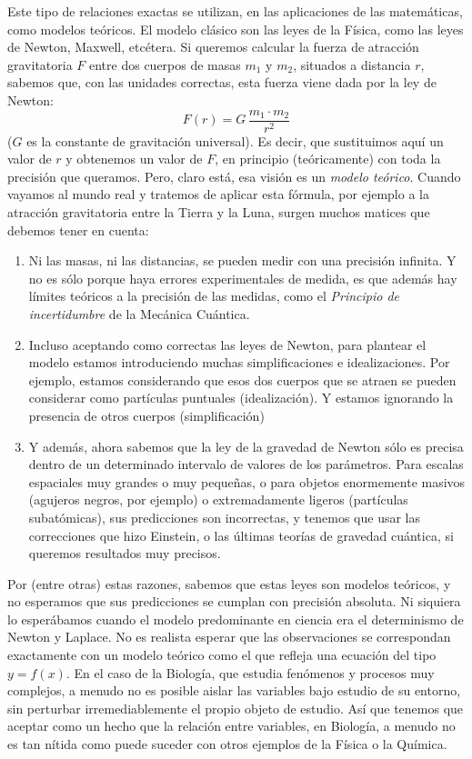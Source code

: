 Este tipo de relaciones exactas se utilizan, en las aplicaciones de las matemáticas, como modelos teóricos. El modelo clásico son las leyes de la Física, como las leyes de Newton, Maxwell, etcétera. Si queremos calcular la fuerza de atracción gravitatoria $F$ entre dos cuerpos de masas $m_1$ y $m_2$, situados a distancia $r$, sabemos que, con las unidades correctas, esta fuerza viene dada por la ley de Newton:
        \[F(r)=G\,\dfrac{m_1\cdot m_2}{r^2}\]
($G$ es la constante de gravitación universal). Es decir, que sustituimos aquí un valor de $r$ y obtenemos un valor de $F$, en principio (teóricamente) con toda la precisión que queramos. Pero, claro está, esa visión es un {\em modelo teórico}. Cuando vayamos al mundo real y tratemos de aplicar esta fórmula, por ejemplo a  la atracción gravitatoria entre la Tierra y la Luna, surgen muchos matices que debemos tener en cuenta:
        \begin{enumerate}
            \item Ni las masas, ni las distancias, se pueden medir con una precisión infinita.
               Y no es sólo porque haya errores experimentales de medida, es que además hay
                límites teóricos a la precisión de las medidas, como el {\em Principio de incertidumbre} de la Mecánica Cuántica.
            \item Incluso aceptando como correctas las leyes de Newton, para plantear el modelo
                estamos introduciendo muchas simplificaciones e idealizaciones. Por ejemplo,  estamos considerando que esos dos cuerpos que se atraen se pueden considerar como partículas puntuales (idealización). Y estamos ignorando la presencia de otros cuerpos (simplificación)
            \item Y además, ahora sabemos que la ley de la gravedad de Newton sólo es precisa
                dentro de un determinado intervalo de valores de los parámetros. Para escalas
                espaciales muy grandes o muy pequeñas, o para objetos enormemente masivos
                (agujeros negros, por ejemplo) o extremadamente ligeros (partículas
                subatómicas), sus predicciones son incorrectas, y tenemos que usar las
                correcciones que hizo Einstein, o las últimas teorías de gravedad cuántica, si
                queremos resultados muy precisos.
        \end{enumerate}

Por (entre otras) estas razones, sabemos que estas leyes son modelos teóricos, y no
esperamos que sus predicciones se cumplan con precisión absoluta. Ni siquiera lo
esperábamos cuando el modelo predominante en ciencia era el determinismo de Newton y
Laplace.
No es realista esperar que las observaciones se correspondan exactamente con un modelo
teórico como el que refleja una ecuación del tipo $y=f(x)$. En el caso de la Biología,
que estudia fenómenos y procesos muy complejos, a menudo no es posible aislar las variables bajo estudio de su entorno, sin perturbar irremediablemente el propio objeto de estudio.
Así que tenemos que aceptar como un hecho que la relación entre variables, en Biología,
a menudo no es tan nítida como puede suceder con otros ejemplos de la Física o la Química.


